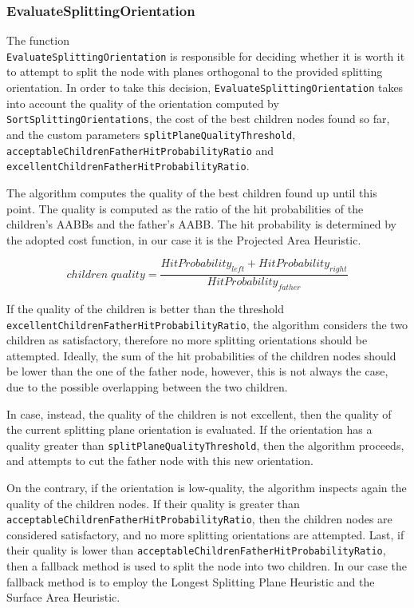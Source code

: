 \documentclass[acmtog, anonymous, review]{acmart}
\begin{document}
\subsubsection{EvaluateSplittingOrientation} \label{ssec:eval_split_orientation}
The function \\\texttt{EvaluateSplittingOrientation} is responsible for deciding whether it is worth it to attempt to split the node with planes orthogonal to the provided splitting orientation. In order to take this decision, \texttt{EvaluateSplittingOrientation} takes into account the quality of the orientation computed by \texttt{SortSplittingOrientations}, the cost of the best children nodes found so far, and the custom parameters \texttt{splitPlaneQualityThreshold}, \\\texttt{acceptableChildrenFatherHitProbabilityRatio} and \\\texttt{excellentChildrenFatherHitProbabilityRatio}.

The algorithm computes the quality of the best children found up until this point. The quality is computed as the ratio of the hit probabilities of the children's AABBs and the father's AABB. The hit probability is determined by the adopted cost function, in our case it is the Projected Area Heuristic.

\begin{equation}
  children\;quality = \frac{HitProbability_{left} + HitProbability_{right}}{HitProbability_{father}}
\end{equation}

If the quality of the children is better than the threshold \\\texttt{excellentChildrenFatherHitProbabilityRatio}, the algorithm considers the two children as satisfactory, therefore no more splitting orientations should be attempted. Ideally, the sum of the hit probabilities of the children nodes should be lower than the one of the father node, however, this is not always the case, due to the possible overlapping between the two children.

In case, instead, the quality of the children is not excellent, then the quality of the current splitting plane orientation is evaluated. If the orientation has a quality greater than \texttt{splitPlaneQualityThreshold}, then the algorithm proceeds, and attempts to cut the father node with this new orientation.

On the contrary, if the orientation is low-quality, the algorithm inspects again the quality of the children nodes. If their quality is greater than \texttt{acceptableChildrenFatherHitProbabilityRatio}, then the children nodes are considered satisfactory, and no more splitting orientations are attempted. Last, if their quality is lower than \texttt{acceptableChildrenFatherHitProbabilityRatio}, then a fallback method is used to split the node into two children. In our case the fallback method is to employ the Longest Splitting Plane Heuristic and the Surface Area Heuristic.
\end{document}
